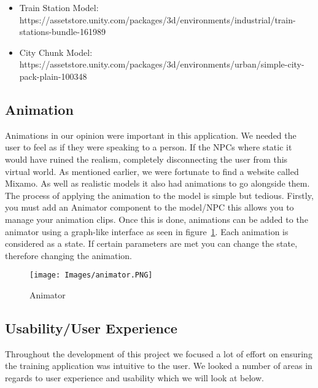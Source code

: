 \begin{itemize}
    \item Train Station Model: https://assetstore.unity.com/packages/3d/environments/industrial/train-stations-bundle-161989
    \item City Chunk Model: https://assetstore.unity.com/packages/3d/environments/urban/simple-city-pack-plain-100348
\end{itemize}

\subsection{Animation}
Animations in our opinion were important in this application. We needed the user to feel as if they were speaking to a person. If the NPCs where static it would have ruined the realism, completely disconnecting the user from this virtual world. As mentioned earlier, we were fortunate to find a website called Mixamo\cite{Mixamo31:online}. As well as realistic models it also had animations to go alongside them. The process of applying the animation to the model is simple but tedious. Firstly, you must add an Animator component to the model/NPC this allows you to manage your animation clips. Once this is done, animations can be added to the animator using a graph-like interface as seen in figure~\ref{fig:anim}. Each animation is considered as a state. If certain parameters are met you can change the state, therefore changing the animation.

\begin{figure}[!ht]
    \centering
    \caption{Animator}
    \texttt{[image: Images/animator.PNG]}
    \label{fig:anim}
\end{figure}

\newpage
\subsection{Usability/User Experience}
Throughout the development of this project we focused a lot of effort on ensuring the training application was intuitive to the user. We looked a number of areas in regards to user experience and usability which we will look at below.

